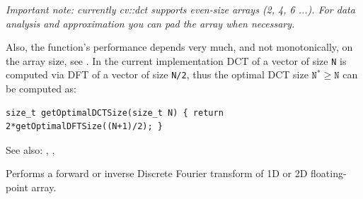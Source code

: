 \emph{Important note: currently cv::dct supports even-size arrays (2, 4, 6 ...). For data analysis and approximation you can pad the array when necessary.}

Also, the function's performance depends very much, and not monotonically, on the array size, see . In the current implementation DCT of a vector of size \texttt{N} is computed via DFT of a vector of size \texttt{N/2}, thus the optimal DCT size $\texttt{N}^*\geq\texttt{N}$ can be computed as:

\begin{lstlisting}
size_t getOptimalDCTSize(size_t N) { return 2*getOptimalDFTSize((N+1)/2); }
\end{lstlisting}

See also: , , 


\label{dft}
Performs a forward or inverse Discrete Fourier transform of 1D or 2D floating-point array.

